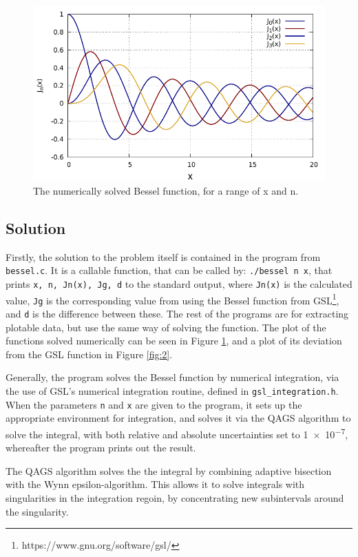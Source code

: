 \documentclass[twocolumn,article]{memoir}
\begin{document}
\begin{figure}[ht]
	\centering
	\includegraphics[width=\linewidth]{fig.pdf}
	\caption{The numerically solved Bessel function, for a range of x and n.}
	\label{fig:1}
\end{figure}


\subsection*{Solution}
Firstly, the solution to the problem itself is contained in the program from \texttt{bessel.c}. It is a callable function, that can be called by: \texttt{./bessel n x}, that prints \texttt{x, n, Jn(x), Jg, d} to the standard output, where \texttt{Jn(x)} is the calculated value, \texttt{Jg} is the corresponding value from using the Bessel function from GSL\footnote{https://www.gnu.org/software/gsl/}, and \texttt{d} is the difference between these. The rest of the programs are for extracting plotable data, but use the same way of solving the function. The plot of the functions solved numerically can be seen in Figure \ref{fig:1}, and a plot of its deviation from the GSL function in Figure \ref{fig:2}.

Generally, the program solves the Bessel function by numerical integration, via the use of GSL's numerical integration routine, defined in \texttt{gsl\_integration.h}. When the parameters \texttt{n} and \texttt{x} are given to the program, it sets up the appropriate environment for integration, and solves it via the QAGS algorithm to solve the integral, with both relative and absolute uncertainties set to \num{1e-7}, whereafter the program prints out the result.

The QAGS algorithm solves the the integral by combining adaptive bisection with the Wynn epsilon-algorithm. This allows it to solve integrals with singularities in the integration regoin, by concentrating new subintervals around the singularity. 
\end{document}
